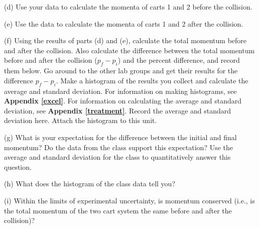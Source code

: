 \newpage
(d) Use your data to calculate the momenta of carts 1 and 2 before the collision.
\vspace{30mm}

(e) Use the data to calculate the momenta of carts 1 and 2 after the collision.
\vspace{30mm}

(f) Using the results of parts (d) and (e), calculate the total momentum before and after the collision. 
Also calculate the difference between the total momentum before and after the collision ($p_f - p_i$) and the percent difference, and record them below.
Go around to the other lab groups and get their results for the difference $p_f - p_i$.
Make a histogram of the results you collect and calculate the average and standard deviation.
For information on making histograms, see \textbf{Appendix \ref{excel}}. For information on calculating the average and standard deviation, see \textbf{Appendix \ref{treatment}}. Record the average and standard 
deviation here. Attach the histogram to this unit.
\vspace{40mm}

(g) What is your expectation for the difference between the initial and final momentum? Do the data from the class support this expectation?  Use the average and standard deviation for the class to quantitatively answer this question.
\vspace{20mm}

(h) What does the histogram of the class data tell you?
\vspace{20mm}

(i) Within the limits of experimental uncertainty, is momentum 
conserved (i.e., is the total momentum of the two cart system the same before
and after the collision)?

